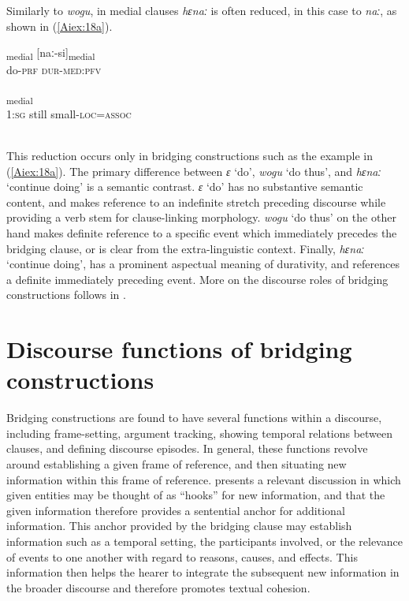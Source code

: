 \documentclass[output=paper]{LSP/langsci}
\begin{document}
Similarly to \textit{wogu}, in medial clauses \textit{hɛnaː} is often reduced, in this case to \textit{naː}, as shown in (\ref{Aiex:18a}).

\begin{exe}
\ex \label{Aiex:18ab}
\begin{xlist}
\ex \label{Aiex:18a}
\gll [ɛ-ɸɛija]\textsubscript{medial}	[naː-si]\textsubscript{medial}\\
do-\textsc{prf}	\textsc{dur-med:pfv}\\
\glt {}\\
\ex \label{Aiex:18b}
\gll [nɛ	ɛna	hodosu-wɛ=mi]\textsubscript{medial}\\
\textsc{1:sg}	still	small\textsc{-loc=assoc}\\
\glt {}\\
\end{xlist}
\end{exe}

This reduction occurs only in bridging constructions such as the example in (\ref{Aiex:18a}). The primary difference between \textit{ɛ} ‘do’, \textit{wogu} ‘do thus’, and \textit{hɛnaː} ‘continue doing’ is a semantic contrast. \textit{ɛ} ‘do’ has no substantive semantic content, and makes reference to an indefinite stretch preceding discourse while providing a verb stem for clause-linking morphology. \textit{wogu} ‘do thus’ on the other hand makes definite reference to a specific event which immediately precedes the bridging clause, or is clear from the extra-linguistic context. Finally, \textit{hɛnaː} ‘continue doing’, has a prominent aspectual meaning of durativity, and references a definite immediately preceding event. More on the discourse roles of bridging constructions follows in .

\section{Discourse functions of bridging constructions} 
\label{AiDiscourse}
Bridging constructions are found to have several functions within a discourse, including frame-setting, argument tracking, showing temporal relations between clauses, and defining discourse episodes. In general, these functions revolve around establishing a given frame of reference, and then situating new information within this frame of reference. \citet{prince81} presents a relevant discussion in which given entities may be thought of as ``hooks'' for new information, and that the given information therefore provides a sentential anchor for additional information. This anchor provided by the bridging clause may establish information such as a temporal setting, the participants involved, or the relevance of events to one another with regard to reasons, causes, and effects. This information then helps the hearer to integrate the subsequent new information in the broader discourse and therefore promotes textual cohesion.
\end{document}
